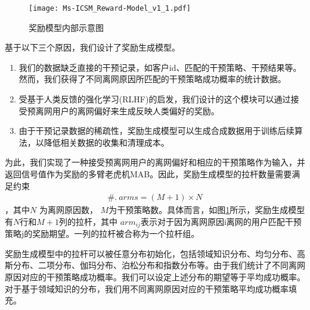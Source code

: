 \begin{figure}[hbt]
	\centering
	\texttt{[image: Ms-ICSM\_Reward-Model\_v1\_1.pdf]}
	\caption{奖励模型内部示意图}
	\label{Fig:Reward-Model}
\end{figure}
基于以下三个原因，我们设计了奖励生成模型。
\begin{enumerate}	
	\item 我们的数据缺乏直接的干预记录，如客户id、匹配的干预策略、干预结果等。然而，我们获得了不同离网原因所匹配的干预策略成功概率的统计数据。
	\item 受基于人类反馈的强化学习(RLHF)的启发，我们设计的这个模块可以通过接受预离网用户的离网偏好来生成反映人类偏好的奖励。
	\item 由于干预记录数据的稀疏性，奖励生成模型可以生成合成数据用于训练后续算法，以降低相关数据的收集和清理成本。
\end{enumerate}
\par
为此，我们实现了一种接受预离网用户的离网偏好和相应的干预策略作为输入，并返回信号值作为奖励的多臂老虎机MAB。因此，奖励生成模型的拉杆数量需要满足约束
\begin{equation}
	\begin{aligned}
		\#. ~ arms = (M + 1) \times N
	\end{aligned}
	\label{Eq:bandit-constraint}
\end{equation}	
，其中$N$ 为离网原因数， $M$为干预策略数。具体而言，如图\ref{Fig:Reward-Model}所示，奖励生成模型有$N$行和$M+1$列的拉杆，其中 $arm_{ij}$表示对于因为离网原因i离网的用户匹配干预策略j的奖励期望。一列的拉杆被合称为一个拉杆组。\par
奖励生成模型中的拉杆可以被任意分布初始化，包括领域知识分布、均匀分布、高斯分布、二项分布、伽玛分布、泊松分布和指数分布等。由于我们统计了不同离网原因对应的干预策略成功概率。我们可以设定上述分布的期望等于平均成功概率。对于基于领域知识的分布，我们用不同离网原因对应的干预策略平均成功概率填充。\par
	
